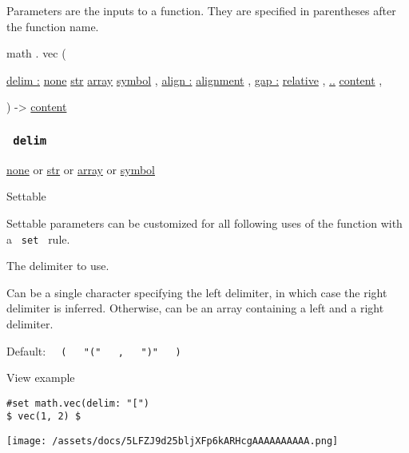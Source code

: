 \label{parameters-tooltip}
Parameters are the inputs to a function. They are specified in
parentheses after the function name.

math { . } { vec } (

{ \hyperref[parameters-delim]{delim :}
\href{/docs/reference/foundations/none/}{none}
\href{/docs/reference/foundations/str/}{str}
\href{/docs/reference/foundations/array/}{array}
\href{/docs/reference/symbols/symbol/}{symbol} , } {
\hyperref[parameters-align]{align :}
\href{/docs/reference/layout/alignment/}{alignment} , } {
\hyperref[parameters-gap]{gap :}
\href{/docs/reference/layout/relative/}{relative} , } {
\hyperref[parameters-children]{..}
\href{/docs/reference/foundations/content/}{content} , }

) -\textgreater{} \href{/docs/reference/foundations/content/}{content}

\subsubsection{\texorpdfstring{\texttt{\ delim\ }}{ delim }}\label{parameters-delim}

\href{/docs/reference/foundations/none/}{none} {or}
\href{/docs/reference/foundations/str/}{str} {or}
\href{/docs/reference/foundations/array/}{array} {or}
\href{/docs/reference/symbols/symbol/}{symbol}

{{ Settable }}

\label{parameters-delim-settable-tooltip}
Settable parameters can be customized for all following uses of the
function with a \texttt{\ set\ } rule.

The delimiter to use.

Can be a single character specifying the left delimiter, in which case
the right delimiter is inferred. Otherwise, can be an array containing a
left and a right delimiter.

Default:
\texttt{\ }{\texttt{\ (\ }}\texttt{\ }{\texttt{\ "("\ }}\texttt{\ }{\texttt{\ ,\ }}\texttt{\ }{\texttt{\ ")"\ }}\texttt{\ }{\texttt{\ )\ }}\texttt{\ }


View example

\begin{verbatim}
#set math.vec(delim: "[")
$ vec(1, 2) $
\end{verbatim}

\texttt{[image: /assets/docs/5LFZJ9d25bljXFp6kARHcgAAAAAAAAAA.png]}


